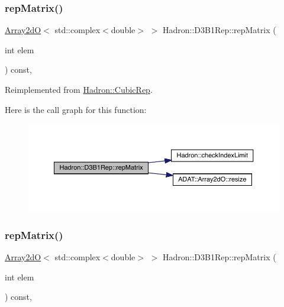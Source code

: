 \subsubsection{\texorpdfstring{repMatrix()}{repMatrix()}\hspace{0.1cm}{\footnotesize\ttfamily [1/2]}}
{\footnotesize\ttfamily \mbox{\hyperlink{classADAT_1_1Array2dO}{Array2dO}}$<$ std\+::complex$<$double$>$ $>$ Hadron\+::\+D3\+B1\+Rep\+::rep\+Matrix (\begin{DoxyParamCaption}\item[{int}]{elem }\end{DoxyParamCaption}) const\hspace{0.3cm}{\ttfamily [inline]}, {\ttfamily [virtual]}}



Reimplemented from \mbox{\hyperlink{structHadron_1_1CubicRep_ac5d7e9e6f4ab1158b5fce3e4ad9e8005}{Hadron\+::\+Cubic\+Rep}}.

Here is the call graph for this function\+:
\nopagebreak
\begin{figure}[H]
\begin{center}
\leavevmode
\includegraphics[width=350pt]{de/dc2/structHadron_1_1D3B1Rep_a2a0563aa28c476f89e8b13f3a95b7cfd_cgraph}
\end{center}
\end{figure}
\mbox{\label{structHadron_1_1D3B1Rep_a2a0563aa28c476f89e8b13f3a95b7cfd}} 
\subsubsection{\texorpdfstring{repMatrix()}{repMatrix()}\hspace{0.1cm}{\footnotesize\ttfamily [2/2]}}
{\footnotesize\ttfamily \mbox{\hyperlink{classADAT_1_1Array2dO}{Array2dO}}$<$ std\+::complex$<$double$>$ $>$ Hadron\+::\+D3\+B1\+Rep\+::rep\+Matrix (\begin{DoxyParamCaption}\item[{int}]{elem }\end{DoxyParamCaption}) const\hspace{0.3cm}{\ttfamily [inline]}, {\ttfamily [virtual]}}



